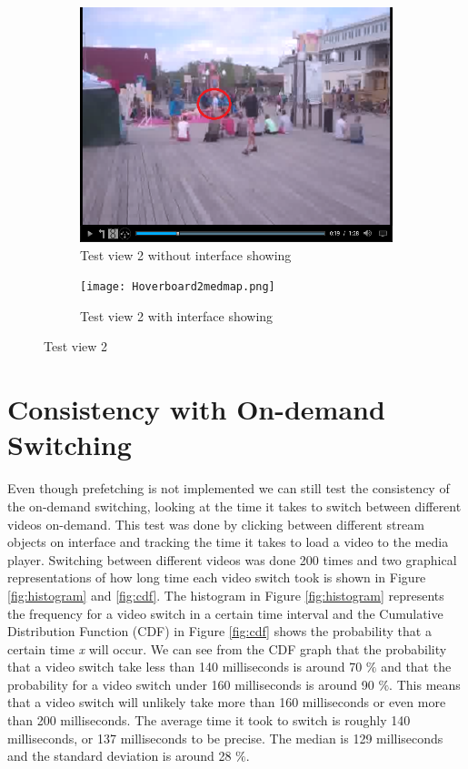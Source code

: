 \begin{figure}
\begin{subfigure}[b]{0.5\textwidth}
 	\includegraphics[width=\linewidth]{Hoverboard_2.png}
  	\caption{Test view 2 without interface showing}\label{fig:testview2A}
    \end{subfigure}\hfill 
    \hspace{3px}
    \begin{subfigure}[b]{0.5\textwidth}
	 \texttt{[image: Hoverboard2medmap.png]}
 	\caption{Test view 2 with interface showing}\label{fig:testview2B}
    \end{subfigure}
	\caption{Test view 2}
	\label{fig:testview2}
\end{figure}

\section{Consistency with On-demand Switching}
Even though prefetching is not implemented we can still test the consistency of the on-demand switching, looking at the time it takes to switch between different videos on-demand. This test was done by clicking between different stream objects on interface and tracking the time it takes to load a video to the media player. Switching between different videos was done 200 times and two graphical representations of how long time each video switch took is shown in Figure \ref{fig:histogram} and \ref{fig:cdf}. The histogram in Figure \ref{fig:histogram} represents the frequency for a video switch in a certain time interval and the Cumulative Distribution Function (CDF) in Figure \ref{fig:cdf} shows the probability that a certain time \textit{x} will occur. We can see from the CDF graph that the probability that a video switch take less than 140 milliseconds is around 70 $\%$ and that the probability for a video switch under 160 milliseconds is around 90 $\%$. This means that a video switch will unlikely take more than 160 milliseconds or even more than 200 milliseconds. The average time it took to switch is roughly 140 milliseconds, or 137 milliseconds to be precise. The median is 129 milliseconds and the standard deviation is around 28 $\%$.

